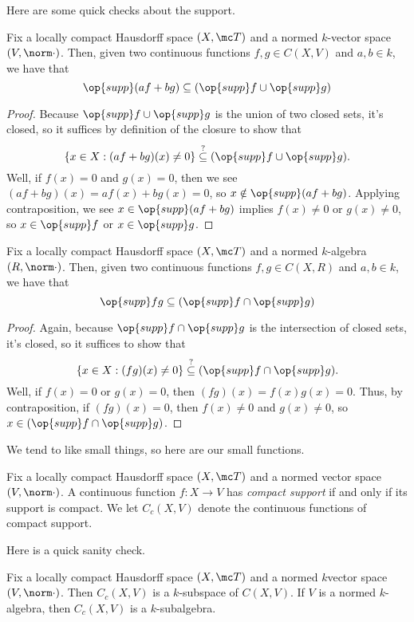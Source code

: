 \documentclass[../notes.tex]{subfiles}
\begin{document}
Here are some quick checks about the support.
\begin{lemma} \label{lem:linear-combo-supp}
	Fix a locally compact Hausdorff space $(X,\mc T)$ and a normed $k$-vector space $(V,\norm\cdot)$. Then, given two continuous functions $f,g\in C(X,V)$ and $a,b\in k$, we have that
	\[\op{supp}(af+bg)\subseteq(\op{supp}f\cup\op{supp}g)\]
\end{lemma}
\begin{proof}
	Because $\op{supp}f\cup\op{supp}g$ is the union of two closed sets, it's closed, so it suffices by definition of the closure to show that
	\[\{x\in X:(af+bg)(x)\ne0\}\stackrel?\subseteq(\op{supp}f\cup\op{supp}g).\]
	Well, if $f(x)=0$ and $g(x)=0$, then we see $(af+bg)(x)=af(x)+bg(x)=0$, so $x\notin\op{supp}(af+bg)$. Applying contraposition, we see $x\in\op{supp}(af+bg)$ implies $f(x)\ne0$ or $g(x)\ne0$, so $x\in\op{supp}f$ or $x\in\op{supp}g$.
\end{proof}
\begin{lemma} \label{lem:mult-supp}
	Fix a locally compact Hausdorff space $(X,\mc T)$ and a normed $k$-algebra $(R,\norm\cdot)$. Then, given two continuous functions $f,g\in C(X,R)$ and $a,b\in k$, we have that
	\[\op{supp}fg\subseteq(\op{supp}f\cap\op{supp}g)\]
\end{lemma}
\begin{proof}
	Again, because $\op{supp}f\cap\op{supp}g$ is the intersection of closed sets, it's closed, so it suffices to show that
	\[\{x\in X:(fg)(x)\ne0\}\stackrel?\subseteq(\op{supp}f\cap\op{supp}g).\]
	Well, if $f(x)=0$ or $g(x)=0$, then $(fg)(x)=f(x)g(x)=0$. Thus, by contraposition, if $(fg)(x)=0$, then $f(x)\ne0$ and $g(x)\ne0$, so $x\in(\op{supp}f\cap\op{supp}g)$.
\end{proof}
We tend to like small things, so here are our small functions.
\begin{definition}
	Fix a locally compact Hausdorff space $(X,\mc T)$ and a normed vector space $(V,\norm\cdot)$. A continuous function $f\colon X\to V$ has \textit{compact support} if and only if its support is compact. We let $C_c(X,V)$ denote the continuous functions of compact support.
\end{definition}
Here is a quick sanity check.
\begin{lemma}
	Fix a locally compact Hausdorff space $(X,\mc T)$ and a normed $k$vector space $(V,\norm\cdot)$. Then $C_c(X,V)$ is a $k$-subspace of $C(X,V)$. If $V$ is a normed $k$-algebra, then $C_c(X,V)$ is a $k$-subalgebra.
\end{lemma}
\end{document}
